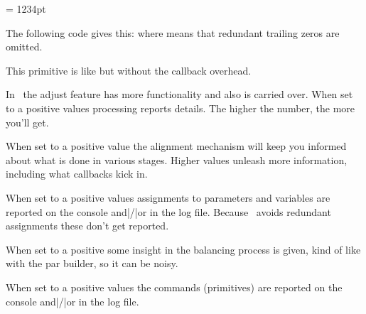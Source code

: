 \stopnewprimitive

\startnewprimitive[title={\prm {tosparsescaled}}]

\startbuffer
\scratchdimen = 1234pt \tosparsescaled\scratchdimen
\stopbuffer

The following code gives this: {\nospacing\inlinebuffer} where 
means that redundant trailing zeros are omitted.

\typebuffer

\stopnewprimitive

\startnewprimitive[title={\prm {tpack}}]

This primitive is like  but without the callback overhead.

\stopnewprimitive

\startnewprimitive[title={\prm {tracingadjusts}}]

In \LUAMETATEX\ the adjust feature has more functionality and also is carried
over. When set to a positive values  processing reports details.
The higher the number, the more you'll get.

\stopnewprimitive

\startnewprimitive[title={\prm {tracingalignments}}]

When set to a positive value the alignment mechanism will keep you informed about
what is done in various stages. Higher values unleash more information, including
what callbacks kick in.

\stopnewprimitive

\startoldprimitive[title={\prm {tracingassigns}}]

When set to a positive values assignments to parameters and variables are
reported on the console and|/|or in the log file. Because \LUAMETATEX\ avoids
redundant assignments these don't get reported.

\stopoldprimitive

\startnewprimitive[title={\prm {tracingbalancing}}]

When set to a positive some insight in the balancing process is given, kind of
like with the par builder, so it can be noisy.

\stopnewprimitive

\startoldprimitive[title={\prm {tracingcommands}}]

When set to a positive values the commands (primitives) are reported on the console
and|/|or in the log file.

\stopoldprimitive

\startnewprimitive[title={\prm {tracingexpressions}}]

